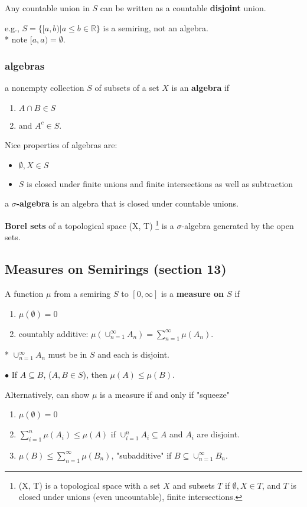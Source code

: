 \documentclass[a4paper, 12pt]{article}
\def\R{\ensuremath{\mathbb{R}}} %
\newcommand{\bt}[1]{\textbf{#1}} %
\begin{document}
\begin{multicols}{2}
Any countable union in $S$ can be written as a countable \bt{disjoint} union.

e.g., $S = \{[a, b) | a \leq b \in \R\}$ is a semiring, not an algebra. \\
* note $[a, a) = \emptyset$.


\subsubsection{algebras}

a nonempty collection $S$ of subsets of a set $X$ is an \bt{algebra} if 
\begin{enumerate}
    \item $A \cap B \in S$ 
    \item and $A^c \in S$. 
\end{enumerate}

Nice properties of algebras are: 
\begin{itemize}
    \item $\emptyset, X \in S$ 
    \item $S$ is closed under finite unions 
and finite intersections as well as subtraction
\end{itemize}

a \bt{$\sigma$-algebra} is an algebra that is closed under countable unions.

\bt{Borel sets} of a topological space (X, T) 
\footnote{(X, T) is a topological space with a set $X$ and subsets $T$ if
$\emptyset, X \in T$, and $T$ is closed under unions (even uncountable), finite intersections.}
is a $\sigma$-algebra 
generated by the open sets.

\subsection{Measures on Semirings (section 13)}
A function $\mu$ from a semiring $S$ to $[0, \infty]$ is a \bt{measure on $S$} if 
\begin{enumerate}
    \item $\mu(\emptyset) = 0$ 
    \item countably additive: $\mu(\cup_{n=1}^\infty A_n) = \sum_{n=1}^\infty \mu(A_n)$.
\end{enumerate}
* $\cup_{n=1}^\infty A_n$ must be in $S$ and each is disjoint.

\noindent $\bullet$ If $A \subseteq B$, ($A, B \in S$), then $\mu(A) \leq \mu(B)$.



Alternatively, can show $\mu$ is a measure if and only if "squeeze" 
\begin{enumerate}
    \item $\mu(\emptyset) = 0$
    \item $\sum_{i=1}^n \mu(A_i) \leq \mu(A)$ if $\cup_{i=1}^n A_i \subseteq A$ and $A_i$ are disjoint.
    \item $\mu(B) \leq \sum_{n=1}^\infty \mu(B_n)$, "subadditive"  if 
    $B \subseteq \cup_{n=1}^\infty B_n$.
\end{enumerate}


\end{multicols}
\end{document}
